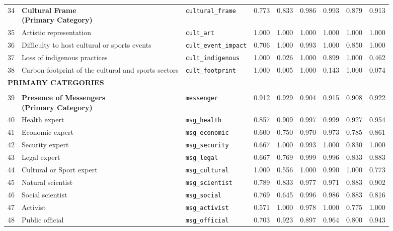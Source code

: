 \begin{longtable}{p{0.4cm}p{4.0cm}p{3.0cm}rrrrrr}
\midrule
\rowcolor{gray!8}
\multicolumn{9}{l}{\textit{Cultural Frame}} \\
\midrule
34 & \textbf{Cultural Frame\newline (Primary Category)} & \texttt{cultural\_frame} & 0.773 & 0.833 & 0.986 & 0.993 & 0.879 & 0.913 \\
\cmidrule(lr){1-9}
35 & Artistic representation & \texttt{cult\_art} & 1.000 & 1.000 & 1.000 & 1.000 & 1.000 & 1.000 \\
36 & Difficulty to host cultural or sports events & \texttt{cult\_event\_impact} & 0.706 & 1.000 & 0.993 & 1.000 & 0.850 & 1.000 \\
37 & Loss of indigenous practices & \texttt{cult\_indigenous} & 1.000 & 0.026 & 1.000 & 0.899 & 1.000 & 0.462 \\
38 & Carbon footprint of the cultural and sports sectors & \texttt{cult\_footprint} & 1.000 & 0.005 & 1.000 & 0.143 & 1.000 & 0.074 \\
\midrule
\multicolumn{9}{l}{\cellcolor{gray!10}\textbf{PRIMARY CATEGORIES}} \\
\midrule
\rowcolor{gray!8}
\multicolumn{9}{l}{\textit{Actors/Messengers}} \\
\midrule
39 & \textbf{Presence of Messengers\newline (Primary Category)} & \texttt{messenger} & 0.912 & 0.929 & 0.904 & 0.915 & 0.908 & 0.922 \\
\cmidrule(lr){1-9}
40 & Health expert & \texttt{msg\_health} & 0.857 & 0.909 & 0.997 & 0.999 & 0.927 & 0.954 \\
41 & Economic expert & \texttt{msg\_economic} & 0.600 & 0.750 & 0.970 & 0.973 & 0.785 & 0.861 \\
42 & Security expert & \texttt{msg\_security} & 0.667 & 1.000 & 0.993 & 1.000 & 0.830 & 1.000 \\
43 & Legal expert & \texttt{msg\_legal} & 0.667 & 0.769 & 0.999 & 0.996 & 0.833 & 0.883 \\
44 & Cultural or Sport expert & \texttt{msg\_cultural} & 1.000 & 0.556 & 1.000 & 0.990 & 1.000 & 0.773 \\
45 & Natural scientist & \texttt{msg\_scientist} & 0.789 & 0.833 & 0.977 & 0.971 & 0.883 & 0.902 \\
46 & Social scientist & \texttt{msg\_social} & 0.769 & 0.645 & 0.996 & 0.986 & 0.883 & 0.816 \\
47 & Activist & \texttt{msg\_activist} & 0.571 & 1.000 & 0.978 & 1.000 & 0.775 & 1.000 \\
48 & Public official & \texttt{msg\_official} & 0.703 & 0.923 & 0.897 & 0.964 & 0.800 & 0.943 \\

\end{longtable}
